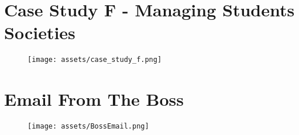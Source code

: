 \section{Case Study F - Managing Students Societies}
\label{appendix_case_study_f}

\begin{figure}[ht]
	\begin{center}
		\texttt{[image: assets/case\_study\_f.png]}
	\end{center}
	\label{case_study_f}
\end{figure}

\section{Email From The Boss}
\label{appendix_email_boss}

\begin{figure}[ht]
	\begin{center}
		\texttt{[image: assets/BossEmail.png]}
	\end{center}
	\label{email_boss}
\end{figure}
